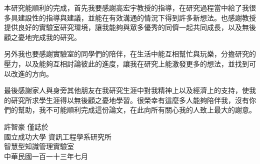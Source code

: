 \StartAcknowledgmentsChi
本研究能順利的完成，首先我要感謝高宏宇教授的指導，在研究過程當中給了我很多具建設性的指導與建議，並能在有效溝通的情況下得到許多新想法。也感謝教授提供良好的實驗室研究環境，讓我能夠與眾多優秀的同儕一起共同成長，以及無後顧之憂地完成我的研究。

另外我也要感謝實驗室的同學們的陪伴，在生活中能互相幫忙與玩樂，分擔研究的壓力，以及能夠互相討論彼此的進度，讓我在研究上能激發更多的想法，並找到可以改進的方向。

最後感謝家人與身旁其他朋友在我研究生涯中對我精神上以及經濟上的支持，使我的研究所求學生涯得以無後顧之憂地學習。很榮幸有這麼多人能夠陪伴我，沒有你們的幫助，我不可能順利完成這份論文，在此向所有關心我的人致上最大的謝意。

{\raggedleft\vfill{
  許智豪 \: 僅誌於\\
  國立成功大學 \: 資訊工程學系研究所\\
  智慧型知識管理實驗室 \\
  中華民國一百一十三年七月
}\par
}
\EndAcknowledgments
